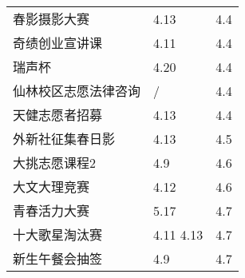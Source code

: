 \documentclass[letterpaper, 12pt]{article}
\begin{document}
\begin{multicols}{2}
{\begin{longtable}{|>{\centering\arraybackslash}m{}|m{}|m{}|}
    春影摄影大赛 & 4.13 & 4.4\\
    奇绩创业宣讲课 & 4.11 & 4.4\\
    瑞声杯 & 4.20 & 4.4\\
    仙林校区志愿法律咨询 & / & 4.4\\
    天健志愿者招募 & 4.13 & 4.4\\
    外新社征集春日影 & 4.13 & 4.5\\
    大挑志愿课程2 & 4.9 & 4.6\\
    大文大理竞赛 & 4.12 & 4.6\\
    青春活力大赛 & 5.17 & 4.7\\
    十大歌星淘汰赛 & 4.11 4.13 & 4.7\\
    新生午餐会抽签 & 4.9 & 4.7\\
    \hline
\end{longtable}
\unskip
\unpenalty
\unpenalty}\unvbox\colbbox
\end{multicols}
\end{document}
